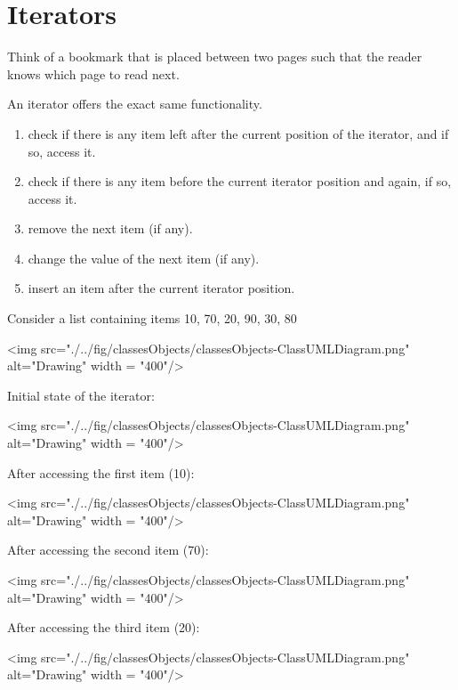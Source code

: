 \section{Iterators}

Think of a bookmark that is placed between two pages such that the reader knows which page to read next.

An iterator offers the exact same functionality. 

\begin{enumerate}
  \item check if there is any item left after the current position of the iterator, and if so, access it. 
  \item check if there is any item before the current iterator position and again, if so, access it. 
  \item remove the next item (if any).
  \item change the value of the next item (if any).
  \item insert an item after the current iterator position.
\end{enumerate}

\vskip 1mm

Consider a list containing items 10, 70, 20, 90, 30, 80
\vskip 1mm

<img src="./../fig/classesObjects/classesObjects-ClassUMLDiagram.png" alt="Drawing" width = "400"/>

\newpage

Initial state of the iterator:
\vskip 1mm

<img src="./../fig/classesObjects/classesObjects-ClassUMLDiagram.png" alt="Drawing" width = "400"/>

\vskip 1mm

After accessing the first item (10):
\vskip 1mm

<img src="./../fig/classesObjects/classesObjects-ClassUMLDiagram.png" alt="Drawing" width = "400"/>

\vskip 1mm

After accessing the second item (70):
\vskip 1mm

<img src="./../fig/classesObjects/classesObjects-ClassUMLDiagram.png" alt="Drawing" width = "400"/>

\vskip 1mm

After accessing the third item (20):
\vskip 1mm

<img src="./../fig/classesObjects/classesObjects-ClassUMLDiagram.png" alt="Drawing" width = "400"/>

\vskip 1mm

